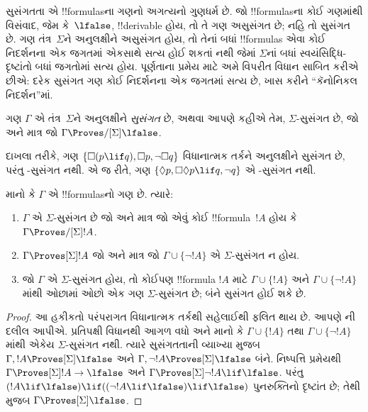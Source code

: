 \documentclass[../../../include/open-logic-section]{subfiles}
\begin{document}


સુસંગતતા એ !!{formula}sના ગણનો અગત્યનો ગુણધર્મ છે. જો !!{formula}sના કોઈ ગણમાંથી
વિસંવાદ, જેમ કે~$\lfalse$, !!{derivable} હોય, તો તે ગણ અસુસંગત છે;
નહિ તો સુસંગત છે. ગણ તંત્ર~$\Sigma$ને અનુલક્ષીને અસુસંગત હોય,
તો તેનાં બધાં !!{formula}s એવા કોઈ નિદર્શનના એક જગતમાં એકસાથે
સત્ય હોઈ શકતાં નથી જેમાં $\Sigma$નાં બધાં સ્વયંસિદ્ધિ-દૃષ્ટાંતો
બધાં જગતોમાં સત્ય હોય. પૂર્ણતાના પ્રમેય માટે
અમે વિપરીત વિધાન સાબિત કરીએ છીએ: દરેક સુસંગત ગણ કોઈ નિદર્શનના એક
જગતમાં સત્ય છે, ખાસ કરીને ``કૅનોનિકલ નિદર્શન''માં.

\begin{defn}
  ગણ $\Gamma$ એ તંત્ર~$\Sigma$ને અનુલક્ષીને \emph{સુસંગત} છે, અથવા
  આપણે કહીએ તેમ, $\Sigma$-સુસંગત છે, જો અને માત્ર જો $\Gamma
  \Proves/[\Sigma] \lfalse$.
\end{defn}

દાખલા તરીકે, ગણ $\{ \Box(p \lif q), \Box p, \lnot\Box q \}$
વિધાનાત્મક તર્કને અનુલક્ષીને સુસંગત છે, પરંતુ -સુસંગત નથી.
એ જ રીતે, ગણ $\{ \Diamond p, \Box\Diamond
p \lif q, \lnot q \}$ એ -સુસંગત નથી.

\begin{prop}
  માનો કે $\Gamma$ એ !!{formula}sનો ગણ છે. ત્યારે:
  \begin{enumerate}
  \item $\Gamma$ એ $\Sigma$-સુસંગત છે જો અને માત્ર જો એવું કોઈ
    !!{formula}~$!A$ હોય કે $\Gamma \Proves/[\Sigma]
    !A$.
  \item {}%
    $\Gamma \Proves[\Sigma] !A$ જો અને માત્ર જો $\Gamma \cup \{
    \lnot!A \}$ એ $\Sigma$-સુસંગત ન હોય.
  \item {}%
    જો $\Gamma$ એ $\Sigma$-સુસંગત હોય, તો કોઈપણ !!{formula}
    $!A$ માટે $\Gamma \cup \{ !A \}$ અને
    $\Gamma \cup \{ \lnot!A \}$માંથી ઓછામાં ઓછો એક ગણ
    $\Sigma$-સુસંગત છે; બંને સુસંગત હોઈ શકે છે.
  \end{enumerate}
\end{prop}

\begin{proof}
  આ હકીકતો પરંપરાગત વિધાનાત્મક તર્કથી સહેલાઈથી ફલિત થાય છે. આપણે
  ની દલીલ આપીએ. પ્રતિપક્ષી વિધાનથી
  આગળ વધો અને માનો કે $\Gamma \cup \{ !A \}$ તથા
  $\Gamma \cup \{ \lnot!A \}$માંથી એકેય $\Sigma$-સુસંગત નથી.
  ત્યારે સુસંગતતાની વ્યાખ્યા મુજબ $\Gamma, !A \Proves[\Sigma]
  \lfalse$ અને $\Gamma, \lnot !A \Proves[\Sigma] \lfalse$ બંને.
  નિષ્પત્તિ પ્રમેયથી $\Gamma \Proves[\Sigma] !A \to \lfalse$ અને
  $\Gamma \Proves[\Sigma] \lnot!A \lif \lfalse$. પરંતુ $(!A \lif
  \lfalse) \lif ((\lnot!A \lif \lfalse) \lif \lfalse)$ પુનરુક્તિનો
  દૃષ્ટાંત છે; તેથી
   મુજબ
  $\Gamma \Proves[\Sigma] \lfalse$.
\end{proof}
\end{document}
